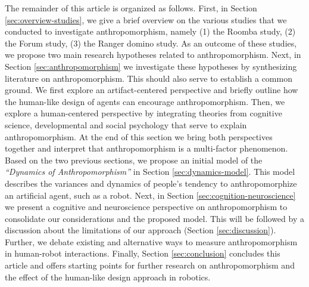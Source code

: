 \documentclass{frontiersSCNS} %
\begin{document}
The remainder of this article is organized as follows. 
First, in Section \ref{sec:overview-studies}, we give a brief overview on the various studies that we conducted to investigate anthropomorphism, namely (1) the Roomba study, (2) the Forum study, (3) the Ranger domino study. As an outcome of these studies, we propose two main research hypotheses related to anthropomorphism.
Next, in Section \ref{sec:anthropomorphism} we investigate these hypotheses by synthesizing literature on anthropomorphism. This should also serve to establish a common ground. We first explore an artifact-centered perspective and briefly outline how the human-like design of agents can encourage anthropomorphism. Then, we explore a human-centered perspective by integrating theories from cognitive science, developmental and social psychology that serve to explain anthropomorphism. At the end of this section we bring both perspectives together and interpret that anthropomorphism is a multi-factor phenomenon.
Based on the two previous sections, we propose an initial model of the \textit{``Dynamics of Anthropomorphism''} in Section \ref{sec:dynamics-model}. This model describes the variances and dynamics of people's tendency to anthropomorphize an artificial agent, such as a robot.
Next, in Section \ref{sec:cognition-neuroscience} we present a cognitive and neuroscience perspective on anthropomorphism to consolidate our considerations and the proposed model.
This will be followed by a discussion about the limitations of our approach (Section \ref{sec:discussion}). Further, we debate existing and alternative ways to measure
anthropomorphism in human-robot interactions.
Finally, Section \ref{sec:conclusion} concludes this article and offers starting points for further research on anthropomorphism and the effect of the human-like design approach in robotics.
\end{document}
